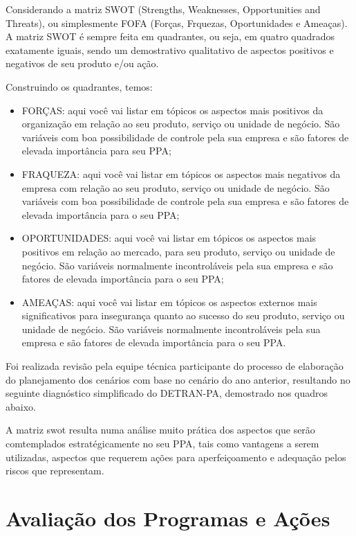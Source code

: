 \documentclass[a4paper]{article}
\begin{document}
Considerando a matriz SWOT (Strengths, Weaknesses, Opportunities and Threats), ou simplesmente FOFA (Forças, Frquezas, Oportunidades e Ameaças). A matriz SWOT é sempre feita em quadrantes, ou seja, em quatro quadrados exatamente iguais, sendo um demostrativo qualitativo de aspectos positivos e negativos de seu produto e/ou ação. \vskip0.3cm

Construindo  os quadrantes, temos:
\vskip0.3cm


\begin{itemize}
\item FORÇAS:  aqui você vai listar  em tópicos os aspectos mais positivos da organização em relação ao seu produto, serviço ou unidade de negócio. São variáveis com boa possibilidade de controle pela sua empresa e são fatores de elevada importância para seu PPA;
\item FRAQUEZA: aqui você vai listar em tópicos os aspectos mais negativos da empresa com relação ao seu produto, serviço ou unidade de negócio. São variáveis com boa possibilidade de controle pela sua empresa e são fatores de elevada importância para o seu PPA;
\item OPORTUNIDADES: aqui você vai listar em tópicos os aspectos mais positivos em relação ao mercado, para seu produto, serviço ou unidade de negócio. São variáveis normalmente incontroláveis pela sua empresa e são fatores de elevada importância para o seu PPA;
\item AMEAÇAS: aqui você vai listar em tópicos os aspectos externos mais significativos para insegurança quanto ao sucesso do seu produto, serviço ou unidade de negócio. São variáveis normalmente incontroláveis pela sua empresa e são fatores de elevada importância para o seu PPA.
\end{itemize}

Foi realizada revisão pela equipe técnica participante do processo de elaboração do planejamento dos cenários com base no cenário do ano anterior, resultando no seguinte diagnóstico simplificado do DETRAN-PA, demostrado nos quadros abaixo.
\vskip0.3cm

A matriz swot resulta numa análise muito prática dos aspectos que serão comtemplados estratégicamente no seu PPA, tais como vantagens a serem utilizadas, aspectos que requerem ações para aperfeiçoamento e adequação pelos riscos que representam.
\vskip0.3cm

\section{Avaliação dos Programas e Ações}
\end{document}
